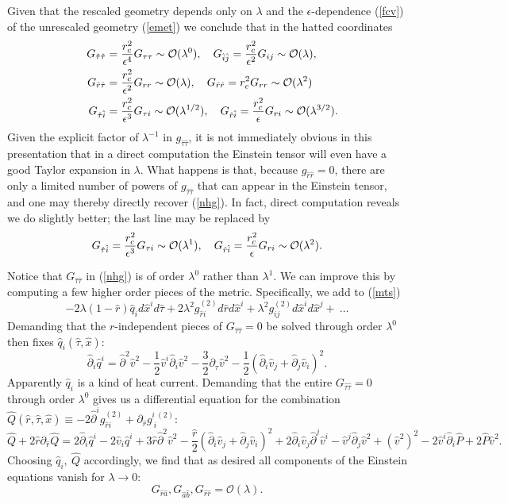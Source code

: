 \documentclass{article}
\def\beq{\begin{equation}}
\def\eeq{\end{equation}}
\def\p{\partial}
\def\t{{ \theta}}
\def\e{{\epsilon}}
\def\v{{\varphi}}
\def\cO{\mathcal{O}}
\def\x{\hat x}
\def\q{\hat q}
\def\r{\hat r}
\def\t{\hat \tau}
\def\v{\hat v}
\begin{document}
Given that the rescaled geometry depends only on $\lambda$ and the $\e$-dependence (\ref{fcv}) of the unrescaled geometry (\ref{emet})
we conclude that in the hatted coordinates
%
\begin{align}
G_{\t \t}&= {r_c^2 \over \e^4} G_{\tau\tau}\sim \cO(\lambda^{0}),
\quad G_{\hat{i}\hat{j}}= {r_c^2\over \e^2} G_{ij}\sim \cO(\lambda),\notag\\
\quad G_{\r\t}&= {r_c^2 \over \e^2}G_{rr}\sim \cO(\lambda),
\quad G_{\r\r}= r_c^2G_{rr}\sim \cO(\lambda^2) \notag\\
G_{\t \hat{i}}&= {r_c^2 \over \e^3} G_{\tau i}\sim \cO(\lambda^{1/2}),
\quad G_{\r \hat{i}}= {r_c^2 \over \e} G_{r i}\sim \cO(\lambda^{3/2}).
\label{nhg}
\end{align}
%
Given the explicit factor of $\lambda^{-1}$ in $g_{\t\t}$, it is not immediately obvious in this presentation that in a direct computation the Einstein tensor will even have a good Taylor expansion in $\lambda$. What happens is that, because $g_{\r\r}=0$, there are only a limited number of powers of $g_{\t\t}$ that can appear in the Einstein tensor, and one may thereby directly recover (\ref{nhg}).  In fact, direct computation reveals  we do slightly better; the last line may be replaced by
%
\beq
G_{\t \hat{i}}= {r_c^2 \over \e^3} G_{\tau i}\sim \cO(\lambda^{1}),
\quad G_{\r \hat{i}}= {r_c^2 \over \e} G_{r i}\sim \cO(\lambda^{2}).
\eeq
%

Notice that $G_{\t\t}$ in (\ref{nhg}) is of order $\lambda^0$ rather than $\lambda^1$.  We can improve this by computing a few higher order pieces of the metric.  Specifically, we add to  (\ref{mts})
%
\beq\label{ellipsisdef}
-2\lambda (1-\r)\q_{i} d\x^i d\t  +2 \lambda^2 g^{(2)}_{\hat{r}i} d\r d\hat{x}^{i}+\lambda^2 g^{(2)}_{ij} d\hat{x}^{i}d\hat{x}^{j}+~\ldots
\eeq
%
Demanding that the $r$-independent pieces of $G_{\t\t}=0$ be solved through order $\lambda^0$ then fixes $\q_i(\t,\hat{x})$:
%
\beq
 \label{op} \hat \p_i\q^i= \hat\p^2 \v^2 -  \frac{1}{2}\v^i  \hat \p_i  \v^2  - \frac{3}{2} \p_{\t} \v^2-\frac{1}{2} \left( \hat \p_i \v_j + \hat \p_j \v_i \right)^2 .
 \eeq
%
Apparently $\q_i$ is  a kind of heat current.
Demanding that the entire $G_{\t\t}=0$ through order $\lambda^0$ gives us a differential equation for the combination $\hat Q(\r,\t,\hat{x})\equiv - 2 \hat \p^{i}  g_{{\r}i}^{(2)} + \p_{\r}g_{~i}^{i~{(2)}}$:
%
\beq%
\label{nyqe}
\hat Q + 2 \r \p_{\r} \hat Q =   2\hat \p_i \q^i - 2 \v_i \q^i  + 3 \r \hat \p^2 \v^2 -  \frac{\r}{2} \left(\hat \p_i \v_j +\hat \p_j \v_i \right)^2 + 2 \hat \p_i \v_j  \hat \p^j \v^i  -  \v^j \hat \p_j \v^2 + \left(\v^2 \right)^2 - 2 \v^i \hat \p_i \hat P + 2 \hat P \v^2 .
\eeq%
%
Choosing $\q_i,~\hat Q$ accordingly, we find that as desired all components of the Einstein equations vanish for $\lambda \to 0$:
%
\beq
\label{fcdv} G_{\r\hat a},G_{\hat a \hat b},G_{\r\r}=\cO(\lambda).
\eeq
%
\end{document}

